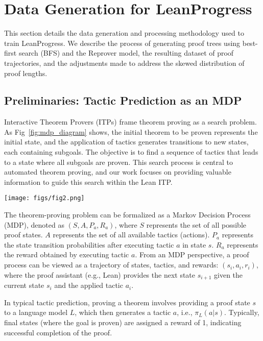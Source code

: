 \section{Data Generation for LeanProgress}
\label{sec:methods}

This section details the data generation and processing methodology used to train LeanProgress. We describe the process of generating proof trees using best-first search (BFS) and the Reprover model, the resulting dataset of proof trajectories, and the adjustments made to address the skewed distribution of proof lengths.

\subsection{Preliminaries: Tactic Prediction as an MDP}

Interactive Theorem Provers (ITPs) frame theorem proving as a search problem. As Fig~\ref{fig:mdp_diagram} shows, the initial theorem to be proven represents the initial state, and the application of tactics generates transitions to new states, each containing subgoals. The objective is to find a sequence of tactics that leads to a state where all subgoals are proven. This search process is central to automated theorem proving, and our work focuses on providing valuable information to guide this search within the Lean ITP.

\begin{figure*}[h]
    \centering
    \texttt{[image: figs/fig2.png]}
    \caption{ \textbf{The visualization of extract proof tree} in theorem proving.}
    \label{fig:mdp_diagram}
\end{figure*}

The theorem-proving problem can be formalized as a Markov Decision Process (MDP), denoted as $(S, A, P_a, R_a)$, where $S$ represents the set of all possible proof states. $A$ represents the set of all available tactics (actions). $P_a$ represents the state transition probabilities after executing tactic $a$ in state $s$. $R_a$ represents the reward obtained by executing tactic $a$. From an MDP perspective, a proof process can be viewed as a trajectory of states, tactics, and rewards: $(s_i, a_i, r_i)$, where the proof assistant (e.g., Lean) provides the next state $s_{i+1}$ given the current state $s_i$ and the applied tactic $a_i$.

In typical tactic prediction, proving a theorem involves providing a proof state $s$ to a language model $L$, which then generates a tactic $a$, i.e., $\pi_L(a|s)$. Typically, final states (where the goal is proven) are assigned a reward of 1, indicating successful completion of the proof.

